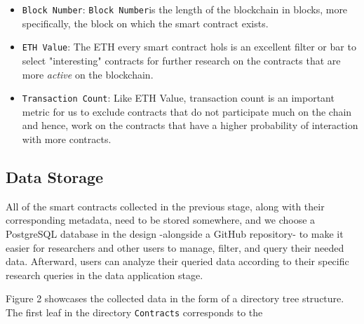 \begin{itemize}
        \item{\verb|Block Number|: \verb|Block Number|is the length of the blockchain in blocks, more specifically, the block on which the smart contract exists.}\\
        \item \verb|ETH Value|: The ETH every smart contract hols is an excellent filter or bar to select "interesting" contracts for further research on the contracts that are more \emph{active} on the blockchain.\\

        \item \verb|Transaction Count|: Like ETH Value, transaction count is an important metric for us to exclude contracts that do not participate much on the chain and hence, work on the contracts that have a higher probability of interaction with more contracts.\\
        \end{itemize}
    
    \subsection{Data Storage}
            All of the smart contracts collected in the previous stage, along with their corresponding metadata, need to be stored somewhere, and we choose a PostgreSQL database in the design -alongside a GitHub repository- to make it easier for researchers and other users to manage, filter, and query their needed data.
            Afterward, users can analyze their queried data according to their specific research queries in the data application stage.

            Figure 2 showcases the collected data in the form of a directory tree structure.
            The first leaf in the directory \texttt{Contracts} corresponds to the \\



